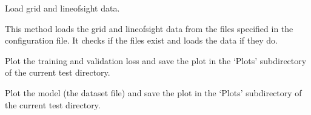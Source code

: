 \documentclass[letterpaper,10pt,english]{sphinxmanual}
\begin{document}
\begin{fulllineitems}
\begin{fulllineitems}
\begin{description}
\end{description}

\end{fulllineitems}


\begin{fulllineitems}
\label{\detokenize{Visualizer:Visualizer.Visualizer.load_datas}}
\pysigstartsignatures
{}
\pysigstopsignatures
\sphinxAtStartPar
Load grid and line\sphinxhyphen{}of\sphinxhyphen{}sight data.
\begin{description}
\sphinxAtStartPar
This method loads the grid and line\sphinxhyphen{}of\sphinxhyphen{}sight data from the files specified in the configuration file.
It checks if the files exist and loads the data if they do.

\end{description}

\end{fulllineitems}


\begin{fulllineitems}
\label{\detokenize{Visualizer:Visualizer.Visualizer.loss_function}}
\pysigstartsignatures
{}
\pysigstopsignatures
\sphinxAtStartPar
Plot the training and validation loss and save the plot in the ‘Plots’ subdirectory of the current test directory.

\end{fulllineitems}


\begin{fulllineitems}
\label{\detokenize{Visualizer:Visualizer.Visualizer.plot_model}}
\pysigstartsignatures
{}
\pysigstopsignatures
\sphinxAtStartPar
Plot the model (the dataset file) and save the plot in the ‘Plots’ subdirectory of the current test directory.

\end{fulllineitems}


\end{fulllineitems}
\end{document}

